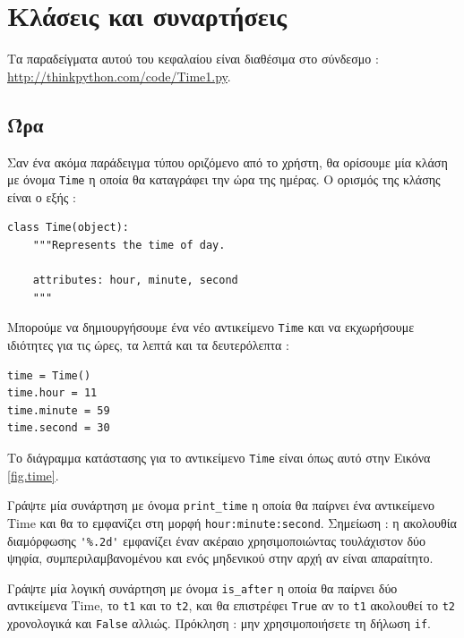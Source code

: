 \documentclass[10pt]{book}
\begin{document}
\chapter{Κλάσεις και συναρτήσεις}
\label{time}

Τα παραδείγματα αυτού του κεφαλαίου είναι διαθέσιμα στο σύνδεσμο :
\url{http://thinkpython.com/code/Time1.py}.

 
\section{Ώρα}
\label{time.object}

Σαν ένα ακόμα παράδειγμα τύπου οριζόμενο από το χρήστη, θα ορίσουμε μία κλάση με όνομα  {\tt Time}  η οποία 
θα καταγράφει την ώρα της ημέρας. Ο ορισμός της κλάσης είναι ο εξής : 

\begin{verbatim}
class Time(object):
    """Represents the time of day.

    attributes: hour, minute, second
    """
\end{verbatim}
%
 Μπορούμε να δημιουργήσουμε ένα νέο αντικείμενο  {\tt Time}  και να εκχωρήσουμε ιδιότητες για τις ώρες, τα λεπτά 
και τα δευτερόλεπτα :

\begin{verbatim}
time = Time()
time.hour = 11
time.minute = 59
time.second = 30
\end{verbatim}
%
 Το διάγραμμα κατάστασης για το αντικείμενο  {\tt Time}  είναι όπως αυτό στην Εικόνα~ \ref{fig.time}.

 
\begin{exercise}
\label{ex.printtime}

Γράψτε μία συνάρτηση με όνομα  \verb"print_time"  η οποία θα παίρνει ένα αντικείμενο  Time  και θα το εμφανίζει στη 
μορφή  {\tt hour:minute:second}.   
Σημείωση :  η ακολουθία διαμόρφωσης  \verb"'%.2d'"  εμφανίζει έναν ακέραιο χρησιμοποιώντας τουλάχιστον δύο ψηφία, 
συμπεριλαμβανομένου και ενός μηδενικού στην αρχή αν είναι απαραίτητο.
\end{exercise}

\begin{exercise}
\label{isafter}

Γράψτε μία λογική συνάρτηση με όνομα  \verb"is_after"  η οποία θα παίρνει δύο αντικείμενα  Time,  το  {\tt t1}  
και το  {\tt t2},  και θα επιστρέφει  {\tt True}  αν το  {\tt t1}  ακολουθεί το  {\tt t2}  χρονολογικά και 
 {\tt False}  αλλιώς. Πρόκληση :  μην χρησιμοποιήσετε τη δήλωση  {\tt if}.
\end{exercise}
\end{document}
